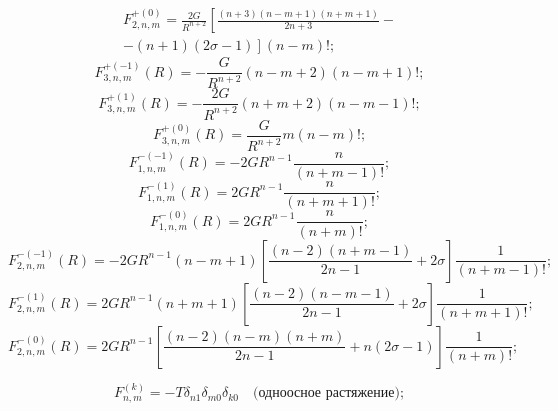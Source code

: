 \begin{multline}
F_{2,n,m}^{ + (0)} = \frac{{2G}}{{{R^{n + 2}}}}\left[ {\frac{{(n + 3)(n - m + 1)(n + m + 1)}}{{2n + 3}} - } \right.\\
\left. { - (n + 1)(2\sigma  - 1)} \right](n - m)!;
\label{eq:8:14a}
\end{multline}
\begin{equation}
F_{3,n,m}^{ + ( - 1)}(R) =  - \frac{G}{{{R^{n + 2}}}}(n - m + 2)(n - m + 1)!;
\label{eq:8:14b}
\end{equation}
\begin{equation}
F_{3,n,m}^{ + (1)}(R) =  - \frac{{2G}}{{{R^{n + 2}}}}(n + m + 2)(n - m - 1)!;
\label{eq:8:15a}
\end{equation}
\begin{equation}
F_{3,n,m}^{ + (0)}(R) = \frac{G}{R^{n+2}}m(n - m)!;
\label{eq:8:15b}
\end{equation}
\begin{equation}
F_{1,n,m}^{ - ( - 1)}(R) =  - 2G{R^{n - 1}}\frac{n}{{(n + m - 1)!}};
\label{eq:8:16a}
\end{equation}
\begin{equation}
F_{1,n,m}^{ - (1)}(R) = 2G{R^{n - 1}}\frac{n}{{(n + m + 1)!}};
\label{eq:8:16b}
\end{equation}
\begin{equation}
F_{1,n,m}^{ - (0)}(R) = 2G{R^{n - 1}}\frac{n}{{(n + m)!}};
\label{eq:8:17a}
\end{equation}
\begin{equation}
F_{2,n,m}^{ - ( - 1)}(R) =  - 2G{R^{n - 1}}(n - m + 1) \left[ {\frac{{(n - 2)(n + m - 1)}}{{2n - 1}} + 2\sigma } \right]\frac{1}{{(n + m - 1)!}};
\label{eq:8:17b}
\end{equation}
\begin{equation}
F_{2,n,m}^{ - (1)}(R) = 2G{R^{n - 1}}(n + m + 1) \left[ {\frac{{(n - 2)(n - m - 1)}}{{2n - 1}} + 2\sigma } \right]\frac{1}{{(n + m + 1)!}};
\label{eq:8:17c}
\end{equation}
\begin{equation}
F_{2,n,m}^{ - (0)}(R) = 2G{R^{n - 1}}\left[ {\frac{{(n - 2)(n - m)(n + m)}}{{2n - 1}} + n(2\sigma  - 1)} \right]\frac{1}{{(n + m)!}};
\label{eq:8:18}
\end{equation}

\begin{equation}
F_{n,m}^{(k)} =  - T{\delta _{n1}}{\delta _{m0}}{\delta _{k0}}\quad\text{(одноосное растяжение)};
\label{eq:8:19}
\end{equation}

